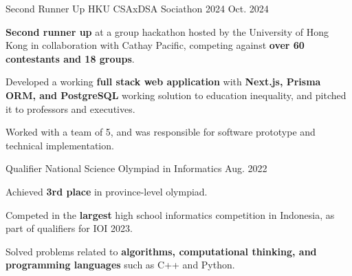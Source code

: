 
\begin{cventries}

  \cventry
    {Second Runner Up} %
    {HKU CSAxDSA Sociathon 2024} %
    {} 
    {Oct. 2024} %
    {
      \begin{cvitems} %
        \item {\textbf{Second runner up} at a group hackathon hosted by the University of Hong Kong in collaboration with Cathay
Pacific, competing against \textbf{over 60 contestants and 18 groups}.}
        \item {Developed a working \textbf{full stack web application} with \textbf{Next.js, Prisma ORM, and PostgreSQL} working solution to
education inequality, and pitched it to professors and executives.}
        \item {Worked with a team of 5, and was responsible for software prototype and technical implementation.}
      \end{cvitems}
    }
  
  \cventry
    {Qualifier} %
    {National Science Olympiad in Informatics} %
    {} 
    {Aug. 2022} %
    {
      \begin{cvitems} %
        \item {Achieved \textbf{3rd place} in province-level olympiad.}
        \item {Competed in the \textbf{largest} high school informatics competition in Indonesia, as part of qualifiers for IOI 2023.}
        \item {Solved problems related to \textbf{algorithms, computational thinking, and programming languages} such as C++ and
Python.}
      \end{cvitems}
    } 
  \end{cventries}
    
  

  


